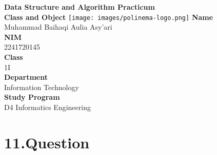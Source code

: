 \documentclass[12pt,titlepage]{article}
\newcommand{\vSubject}{Data Structure and Algorithm Practicum}
\newcommand{\vSubtitle}{Class and Object}
\newcommand{\vName}{Muhammad Baihaqi Aulia Asy'ari}
\newcommand{\vNIM}{2241720145}
\newcommand{\vClass}{1I}
\newcommand{\vDepartment}{Information Technology}
\newcommand{\vStudyProgram}{D4 Informatics Engineering}
\begin{document}
\begin{titlepage}
    \centering
    \vfill
    {\bfseries\LARGE
        \vSubject\\
        \vskip0.25cm
        \vSubtitle
    }
    \vfill
    \texttt{[image: images/polinema-logo.png]}
    \vfill
    {
        \textbf{Name}\\
        \vName\\
        \vskip0.5cm
        \textbf{NIM}\\
        \vNIM\\
        \vskip0.5cm
        \textbf{Class}\\
        \vClass\\
        \vskip0.5cm
        \textbf{Department}\\
        \vDepartment\\
        \vskip0.5cm
        \textbf{Study Program}\\
        \vStudyProgram
    }
\end{titlepage}

\newpage

\section*{11.Question}
\end{document}
